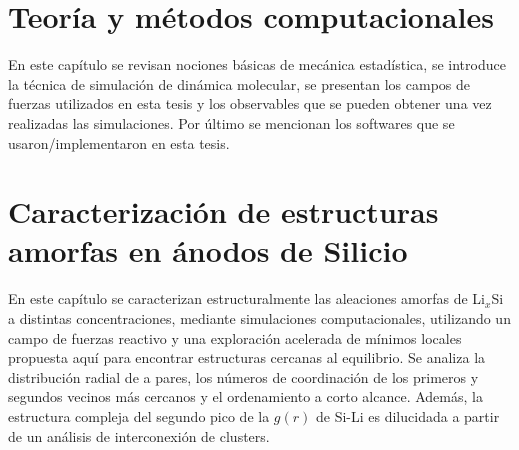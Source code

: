 \documentclass[12pt,spanish,a4paper,twoside]{book}
\begin{document}
\vspace{50pt}

\begin{adjustwidth}{50pt}{50pt}
\end{adjustwidth}

\clearpage
\newpage
\thispagestyle{empty}
\mbox{}
\newpage



\chapter[Teoría y métodos computacionales]{Teoría y métodos computacionales}
\thispagestyle{empty}

\vspace{50pt}

\begin{adjustwidth}{50pt}{50pt}
    En este capítulo se revisan nociones básicas de mecánica estadística, se 
    introduce la técnica de simulación de dinámica molecular, se presentan los 
    campos de fuerzas utilizados en esta tesis y los observables que se pueden 
    obtener una vez realizadas las simulaciones. Por último se mencionan los 
    softwares que se usaron/implementaron en esta tesis.
\end{adjustwidth}

\clearpage
\newpage
\thispagestyle{empty}
\mbox{}
\newpage



\chapter[Estructuras amorfas en ánodos de Silicio]{Caracterización de estructuras
amorfas en ánodos de Silicio}
\thispagestyle{empty}

\vspace{50pt}

\begin{adjustwidth}{50pt}{50pt}
    En este capítulo se caracterizan estructuralmente las aleaciones amorfas de
    Li$_x$Si a distintas concentraciones, mediante simulaciones computacionales,
    utilizando un campo de fuerzas reactivo y una exploración acelerada de mínimos
    locales propuesta aquí para encontrar estructuras cercanas al equilibrio. Se
    analiza la distribución radial de a pares, los números de coordinación de los
    primeros y segundos vecinos más cercanos y el ordenamiento a corto alcance.
    Además, la estructura compleja del segundo pico de la $g(r)$ de Si-Li es 
    dilucidada a partir de un análisis de interconexión de clusters.
\end{adjustwidth}

\clearpage
\newpage
\thispagestyle{empty}
\mbox{}
\newpage



% 



\end{document}
